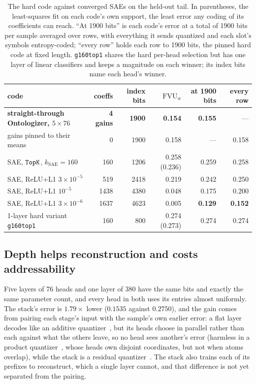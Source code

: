 \begin{table}[tp]\centering\small\setlength{\tabcolsep}{4pt}
\begin{tabular}{@{}lrrrrr@{}}
\toprule
code & coeffs & index bits & $\mathrm{FVU}_w$ & at 1900 bits & every row \\
\midrule
\textbf{straight-through Ontologizer, $5\times76$} & \textbf{4 gains} & \textbf{1900} & \textbf{0.154} & \textbf{0.155} & --- \\
\quad gains pinned to their means & 0 & 1900 & 0.158 & --- & 0.158 \\
SAE, $\mathop{\mathtt{TopK}}\limits$, $k_{\mathrm{SAE}}{=}160$ & 160 & 1206 & 0.258 (0.236) & 0.259 & 0.258 \\
SAE, ReLU+L1 $3\times10^{-5}$ & 519 & 2418 & 0.219 & 0.242 & 0.250 \\
SAE, ReLU+L1 $10^{-5}$ & 1438 & 4380 & 0.048 & 0.175 & 0.200 \\
SAE, ReLU+L1 $3\times10^{-6}$ & 1637 & 4623 & 0.005 & \textbf{0.129} & \textbf{0.152} \\
1-layer hard variant \texttt{g160top1} & 160 & 800 & 0.274 (0.273) & 0.274 & 0.274 \\
\bottomrule
\end{tabular}
\caption{The hard code against converged SAEs on the held-out tail. In
parentheses, the least-squares fit on each code's own support, the least
error any coding of its coefficients can reach. ``At 1900 bits'' is each
code's error at a total of 1900 bits per sample averaged over rows, with
everything it sends quantized and each slot's symbols entropy-coded;
``every row'' holds each row to 1900 bits, the pinned hard code at fixed
length. \texttt{g160top1}
shares the hard per-head selection but has one layer of linear
classifiers and keeps a magnitude on each winner; its index bits name
each head's winner.}
\label{tab:prelim-ste}
\end{table}

\subsection{Depth helps reconstruction and costs addressability}
\label{sec:prelim-depth}
Five layers of 76 heads and one layer of 380 have the same bits and
exactly the same parameter count, and every head in both uses its entries
almost uniformly. The stack's
error is $1.79\times$ lower ($0.1535$ against $0.2750$), and the gain
comes from pairing each stage's input with the sample's own earlier
error: a flat layer decodes like an additive
quantizer~\cite{babenko2014}, but its heads choose in parallel rather
than each against what the others leave, so no head sees another's error
(harmless in a product quantizer~\cite{jegou2011}, whose heads own
disjoint coordinates, but not when atoms overlap), while the stack is a
residual quantizer~\cite{zeghidour2021}. The stack also trains each of its prefixes
to reconstruct, which a single layer cannot, and that difference is not
yet separated from the pairing.

